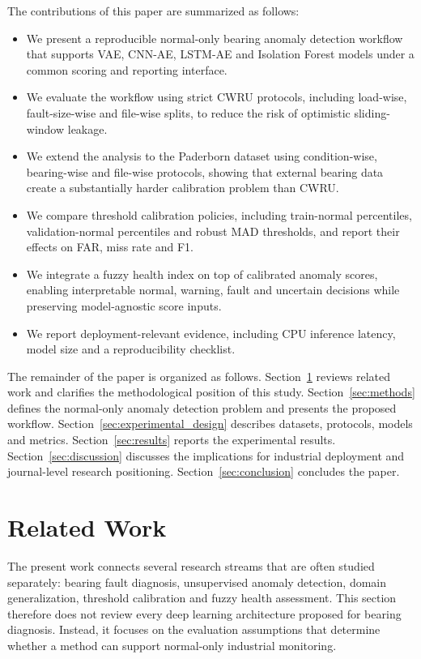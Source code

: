 \documentclass[pdflatex,sn-mathphys-num]{sn-jnl}
\newcommand{\far}{FAR}
\begin{document}
The contributions of this paper are summarized as follows:
\begin{itemize}
  \item We present a reproducible normal-only bearing anomaly detection workflow that supports VAE, CNN-AE, LSTM-AE and Isolation Forest models under a common scoring and reporting interface.
  \item We evaluate the workflow using strict CWRU protocols, including load-wise, fault-size-wise and file-wise splits, to reduce the risk of optimistic sliding-window leakage.
  \item We extend the analysis to the Paderborn dataset using condition-wise, bearing-wise and file-wise protocols, showing that external bearing data create a substantially harder calibration problem than CWRU.
  \item We compare threshold calibration policies, including train-normal percentiles, validation-normal percentiles and robust MAD thresholds, and report their effects on \far, miss rate and F1.
  \item We integrate a fuzzy health index on top of calibrated anomaly scores, enabling interpretable normal, warning, fault and uncertain decisions while preserving model-agnostic score inputs.
  \item We report deployment-relevant evidence, including CPU inference latency, model size and a reproducibility checklist.
\end{itemize}

The remainder of the paper is organized as follows. Section~\ref{sec:related_work} reviews related work and clarifies the methodological position of this study. Section~\ref{sec:methods} defines the normal-only anomaly detection problem and presents the proposed workflow. Section~\ref{sec:experimental_design} describes datasets, protocols, models and metrics. Section~\ref{sec:results} reports the experimental results. Section~\ref{sec:discussion} discusses the implications for industrial deployment and journal-level research positioning. Section~\ref{sec:conclusion} concludes the paper.

\section{Related Work}
\label{sec:related_work}

The present work connects several research streams that are often studied separately: bearing fault diagnosis, unsupervised anomaly detection, domain generalization, threshold calibration and fuzzy health assessment. This section therefore does not review every deep learning architecture proposed for bearing diagnosis. Instead, it focuses on the evaluation assumptions that determine whether a method can support normal-only industrial monitoring.
\end{document}
